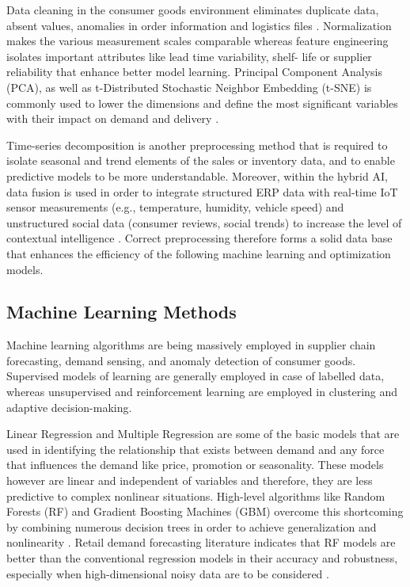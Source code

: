 Data cleaning in the consumer goods environment eliminates duplicate data, absent values, anomalies in order information and logistics files \autocite{guo2023normal}. Normalization makes the various measurement scales comparable whereas feature engineering isolates important attributes like lead time variability, shelf- life or supplier reliability that enhance better model learning. Principal Component Analysis (PCA), as well as t-Distributed Stochastic Neighbor Embedding (t-SNE) is commonly used to lower the dimensions and define the most significant variables with their impact on demand and delivery \autocite{Jahin_2024}.

Time-series decomposition is another preprocessing method that is required to isolate seasonal and trend elements of the sales or inventory data, and to enable predictive models to be more understandable. Moreover, within the hybrid AI, data fusion is used in order to integrate structured ERP data with real-time IoT sensor measurements (e.g., temperature, humidity, vehicle speed) and unstructured social data (consumer reviews, social trends) to increase the level of contextual intelligence \autocite{ivanov_digital_2025}. Correct preprocessing therefore forms a solid data base that enhances the efficiency of the following machine learning and optimization models.


\subsection{Machine Learning Methods}

Machine learning algorithms are being massively employed in supplier chain forecasting, demand sensing, and anomaly detection of consumer goods. Supervised models of learning are generally employed in case of labelled data, whereas unsupervised and reinforcement learning are employed in clustering and adaptive decision-making.

Linear Regression and Multiple Regression are some of the basic models that are used in identifying the relationship that exists between demand and any force that influences the demand like price, promotion or seasonality. These models however are linear and independent of variables and therefore, they are less predictive to complex nonlinear situations. High-level algorithms like Random Forests (RF) and Gradient Boosting Machines (GBM) overcome this shortcoming by combining numerous decision trees in order to achieve generalization and nonlinearity \autocite{breiman_random_2001}. Retail demand forecasting literature indicates that RF models are better than the conventional regression models in their accuracy and robustness, especially when high-dimensional noisy data are to be considered \autocite{mitra_comparative_2022}.

